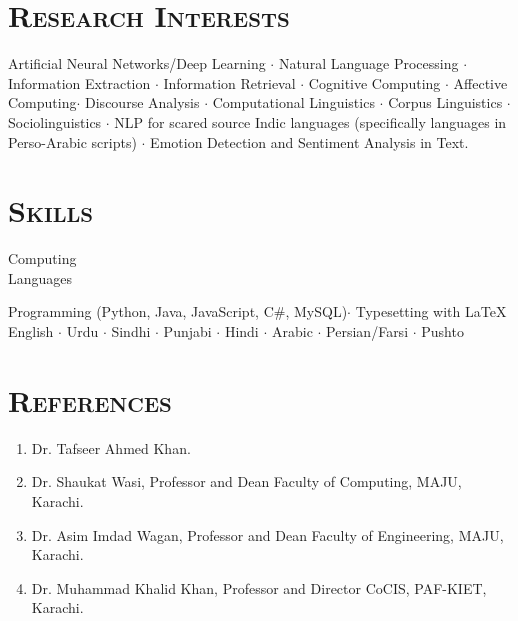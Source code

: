 \documentclass[a4paper, 10pt]{article}
\begin{document}
\section*{\normalfont\textsc{Research Interests}}
Artificial Neural Networks/Deep Learning $\cdot$ Natural Language Processing $\cdot$ Information Extraction $\cdot$ Information Retrieval $\cdot$ Cognitive Computing $\cdot$ Affective Computing$\cdot$ Discourse Analysis $\cdot$ Computational Linguistics $\cdot$  Corpus Linguistics $\cdot$ Sociolinguistics $\cdot$ NLP for scared source Indic languages (specifically languages in Perso-Arabic scripts) $\cdot$ Emotion Detection and Sentiment Analysis in Text.

\section*{\normalfont\textsc{Skills}}
\hfill\begin{minipage}{0.17\textwidth}
Computing\textcolor{lightgray}{\dotfill}\\
Languages\textcolor{lightgray}{\dotfill}
\end{minipage}%
\begin{minipage}{0.8\textwidth}
Programming (Python, Java, JavaScript, C\#, MySQL)$\cdot$ Typesetting with \LaTeX\\
English $\cdot$ Urdu $\cdot$ Sindhi $\cdot$ Punjabi $\cdot$ Hindi $\cdot$ Arabic $\cdot$ Persian/Farsi $\cdot$ Pushto 
\end{minipage}

\section*{\normalfont\textsc{References}}
\begin{enumerate}
\itemsep-4pt
 \item Dr. Tafseer Ahmed Khan.
 \item Dr. Shaukat Wasi, Professor and Dean Faculty of Computing, MAJU, Karachi.
 \item Dr. Asim Imdad Wagan, Professor and Dean Faculty of Engineering, MAJU, Karachi.
 \item Dr. Muhammad Khalid Khan, Professor and Director CoCIS, PAF-KIET, Karachi.
\end{enumerate}
\end{document}
